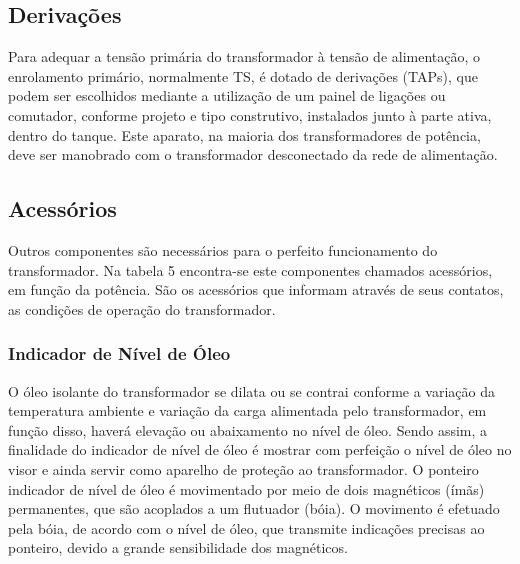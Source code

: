 \documentclass[a5paper,english,spanish,brazil]{ufsc-thesis}
\begin{document}
		\subsection{Derivações}
		Para adequar a tensão primária do transformador à tensão de alimentação, o enrolamento primário, normalmente TS, é dotado de derivações (TAPs), que podem ser escolhidos mediante a utilização de um painel de ligações ou comutador, conforme projeto e tipo construtivo, instalados junto à parte ativa, dentro do tanque. Este aparato, na maioria dos transformadores de potência, deve ser manobrado com o transformador desconectado da rede de alimentação.

		\subsection{Acessórios}
		Outros componentes são necessários para o perfeito funcionamento do
		transformador. Na tabela 5 encontra-se este componentes chamados acessórios, em
		função da potência. São os acessórios que informam através de seus contatos, as
		condições de operação do transformador.

		\subsubsection{Indicador de Nível de Óleo}
		O óleo isolante do transformador se dilata ou se contrai conforme a variação da temperatura ambiente e variação da carga alimentada pelo transformador, em função disso, haverá elevação ou abaixamento no nível de óleo. Sendo assim, a finalidade do indicador de nível de óleo é mostrar com perfeição o nível de óleo no visor e ainda servir como aparelho de proteção ao transformador. O ponteiro indicador de nível de óleo é movimentado por meio de dois magnéticos (ímãs) permanentes, que são acoplados a um flutuador (bóia). O movimento é efetuado pela bóia, de acordo com o nível de óleo, que transmite indicações precisas ao ponteiro, devido a grande sensibilidade dos magnéticos.
\end{document}
